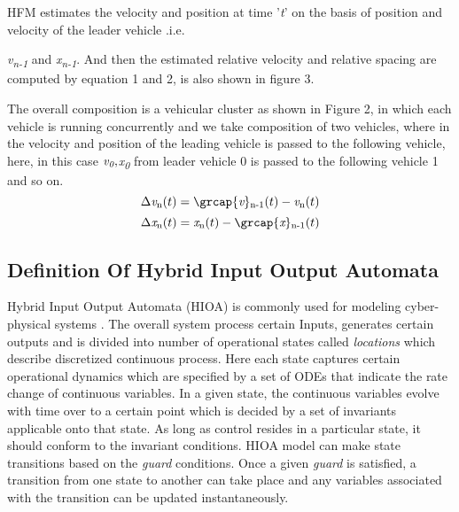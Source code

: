  HFM estimates the velocity  and position  at time '\textit{t}' on the basis of position and velocity of the leader vehicle .i.e. {\textit{v\textsubscript{n-1}} and \textit{x\textsubscript{n-1}}. And then the estimated relative velocity  and relative spacing are computed by equation 1 and 2, is also shown in figure 3. 	
	
The overall composition is a vehicular cluster as shown in Figure 2, in which each vehicle is running concurrently and we take composition of two vehicles, where in the velocity and position of the leading vehicle is passed to the following vehicle, here, in this case $\textit{v\textsubscript{0}},  $\textit{x\textsubscript{0}} from leader vehicle 0 is passed to the following vehicle 1 and so on.
	\begin{equation}
	\Delta \textit{v}\textsubscript{n}(t) = \grcap{\textit{v}}\textsubscript{n-1}(t) -\textit{v}\textsubscript{n}(t) \label{eq} 
	\end{equation}
	\begin{equation}
	\Delta \textit{x}\textsubscript{n}(t) = \textit{x}\textsubscript{n}(t) - \grcap{\textit{x}}\textsubscript{n-1}(t)  \label{eq}
	\end{equation}
\subsection{Definition Of Hybrid Input Output Automata}
Hybrid Input Output Automata (HIOA) is commonly used for modeling cyber-physical systems \citep{Alur1994}. The overall system process certain Inputs, generates certain outputs and is divided into number of operational states called \textit{locations} which describe discretized continuous process. Here each state captures certain operational dynamics which are specified by a set of ODEs that indicate the rate change of continuous variables. In a given state, the continuous variables evolve  with time over to a certain point which is decided by a set of invariants applicable onto that state. As long as control resides in a particular state, it should conform to the invariant conditions. HIOA model can make state transitions based on the \textit{guard} conditions. Once a given \textit{guard} is satisfied,  a transition from one state to another can take place and any variables associated with the transition can be updated instantaneously.

}
